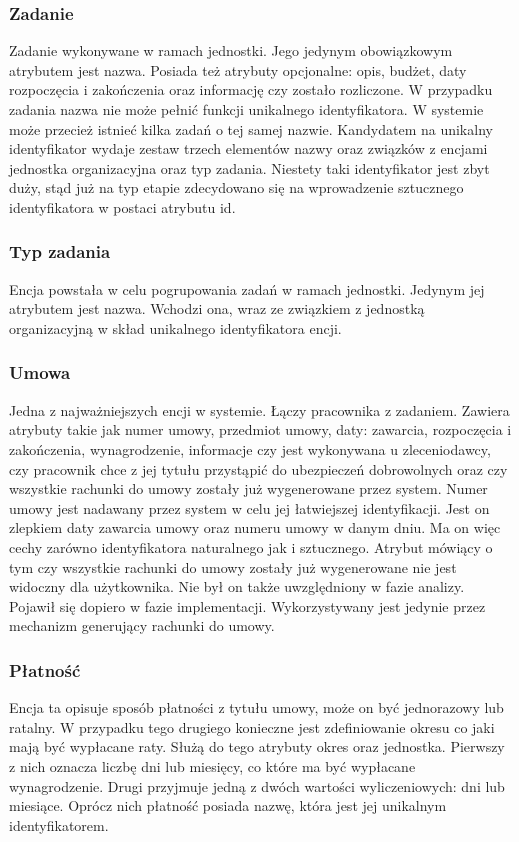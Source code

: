 \subsubsection{Zadanie}
Zadanie wykonywane w ramach jednostki. Jego jedynym obowiązkowym atrybutem jest nazwa. Posiada też atrybuty opcjonalne: opis, budżet, daty rozpoczęcia i zakończenia oraz informację czy zostało rozliczone. W przypadku zadania nazwa nie może pełnić funkcji unikalnego identyfikatora. W systemie może przecież istnieć kilka zadań o tej samej nazwie. Kandydatem na unikalny identyfikator wydaje zestaw trzech elementów nazwy oraz związków z encjami jednostka organizacyjna oraz typ zadania. Niestety taki identyfikator jest zbyt duży, stąd już na typ etapie zdecydowano się na wprowadzenie sztucznego identyfikatora w postaci atrybutu id.

\subsubsection{Typ zadania}
Encja powstała w celu pogrupowania zadań w ramach jednostki. Jedynym jej atrybutem jest nazwa. Wchodzi ona, wraz ze związkiem z jednostką organizacyjną w skład unikalnego identyfikatora encji.

\subsubsection{Umowa}
Jedna z najważniejszych encji w systemie. Łączy pracownika z zadaniem. Zawiera atrybuty takie jak numer umowy, przedmiot umowy, daty: zawarcia, rozpoczęcia i zakończenia, wynagrodzenie, informacje czy jest wykonywana u zleceniodawcy, czy pracownik chce z jej tytułu przystąpić do ubezpieczeń dobrowolnych oraz czy wszystkie rachunki do umowy zostały już wygenerowane przez system. Numer umowy jest nadawany przez system w celu jej łatwiejszej identyfikacji. Jest on zlepkiem daty zawarcia umowy oraz numeru umowy w danym dniu. Ma on więc cechy zarówno identyfikatora naturalnego jak i sztucznego. Atrybut mówiący o tym czy wszystkie rachunki do umowy zostały już wygenerowane nie jest widoczny dla użytkownika. Nie był on także uwzględniony w fazie analizy. Pojawił się dopiero w fazie implementacji. Wykorzystywany jest jedynie przez mechanizm generujący rachunki do umowy.

\subsubsection{Płatność}
Encja ta opisuje sposób płatności z tytułu umowy, może on być jednorazowy lub ratalny. W przypadku tego drugiego konieczne jest zdefiniowanie okresu co jaki mają być wypłacane raty. Służą do tego atrybuty okres oraz jednostka. Pierwszy z nich oznacza liczbę dni lub miesięcy, co które ma być wypłacane wynagrodzenie. Drugi przyjmuje jedną z dwóch wartości wyliczeniowych: dni lub miesiące. Oprócz nich płatność posiada nazwę, która jest jej unikalnym identyfikatorem.

